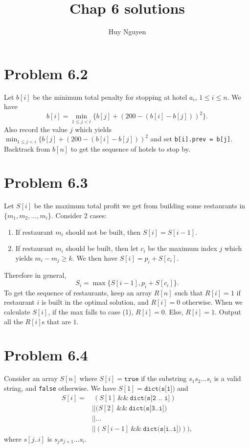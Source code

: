 \documentclass[12pt]{article}
\title{Chap 6 solutions}
\author{Huy Nguyen}
\newcommand{\co}{\texttt}
\renewcommand{\and}{\ \&\& \ }
\begin{document}
\section{Problem 6.2}
Let $b[i]$ be the minimum total penalty for stopping at hotel $a_i$, $1 \le i \le n$. We have $$b[i] = \min_{1 \le j < i} \{ b[j] + (200 - (b[i] - b[j]))^2\}.$$
Also record the value $j$ which yields $\displaystyle \min_{1 \le j < i} \{ b[j] + (200 - (b[i] - b[j]))^2$ and set \co{b[i].prev = b[j]}. Backtrack from $b[n]$ to get the sequence of hotels to stop by.

\section{Problem 6.3}
Let $S[i]$ be the maximum total profit we get from building some restaurants in $\{m_1, m_2, \ldots, m_i\}$. Consider 2 cases:
\begin{enumerate}[(1)]
	\item If restaurant $m_i$ should not be built, then $S[i] = S[i-1]$.
	\item If restaurant $m_i$ should be built, then let $c_i$ be the maximum index $j$ which yields $m_i - m_j \ge k$. We then have $\displaystyle S[i] = p_i + S[c_i]$.
\end{enumerate}
Therefore in general, $$S_i = \max \{ S[i-1], p_i + S[c_i]\}.$$
To get the sequence of restaurants, keep an array $R[n]$ such that $R[i] = 1$ if restaurant $i$ is built in the optimal solution, and $R[i] = 0$ otherwise. When we calculate $S[i]$, if the max falls to case (1), $R[i] = 0$. Else, $R[i] = 1$. Output all the $R[i]$s that are $1$.

\section{Problem 6.4}
Consider an array $S[n]$ where $S[i] = \co{true}$ if the substring $s_1 s_2 \ldots s_i$ is a valid string, and \co{false} otherwise. We have $S[1] = \co{dict(s[1])}$ and 
$$
\begin{aligned}
S[i] = & \ (S[1] \and \co{dict(s[2 .. i]}) \\ 
& || (S[2] \and \co{dict(s[3..i])} \\ 
& || \ldots \\
& || (S[i-1] \and \co{dict(s[i..i])})), 
\end{aligned}$$
where $s[j..i]$ is $s_j s_{j+1} \ldots s_i$.
\end{document}
